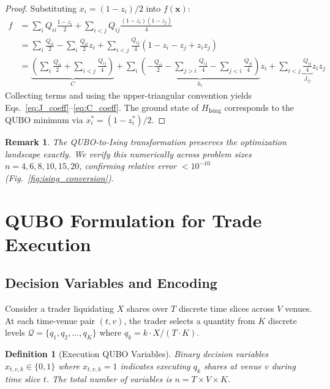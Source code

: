 \documentclass[11pt]{article}
\newcommand{\bx}{\mathbf{x}}
\newtheorem{definition}{Definition}
\newtheorem{remark}{Remark}
\begin{document}
\begin{proof}
Substituting $x_i = (1-z_i)/2$ into $f(\bx)$:
\begin{align}
f &= \sum_i Q_{ii} \frac{1-z_i}{2} + \sum_{i<j} Q_{ij} \frac{(1-z_i)(1-z_j)}{4} \\
&= \sum_i \frac{Q_{ii}}{2} - \sum_i \frac{Q_{ii}}{2}z_i + \sum_{i<j}\frac{Q_{ij}}{4}(1-z_i-z_j+z_iz_j) \\
&= \underbrace{\left(\sum_i \frac{Q_{ii}}{2} + \sum_{i<j}\frac{Q_{ij}}{4}\right)}_{C} + \sum_i \underbrace{\left(-\frac{Q_{ii}}{2} - \sum_{j>i}\frac{Q_{ij}}{4} - \sum_{j<i}\frac{Q_{ji}}{4}\right)}_{h_i} z_i + \sum_{i<j}\underbrace{\frac{Q_{ij}}{4}}_{J_{ij}} z_iz_j
\end{align}
Collecting terms and using the upper-triangular convention yields Eqs.~\eqref{eq:J_coeff}--\eqref{eq:C_coeff}. The ground state of $H_{\mathrm{Ising}}$ corresponds to the QUBO minimum via $x_i^* = (1-z_i^*)/2$.
\end{proof}

\begin{remark}
The QUBO-to-Ising transformation preserves the optimization landscape exactly. We verify this numerically across problem sizes $n = 4, 6, 8, 10, 15, 20$, confirming relative error $< 10^{-10}$ (Fig.~\ref{fig:ising_conversion}).
\end{remark}


\section{QUBO Formulation for Trade Execution}
\label{sec:qubo_formulation}

\subsection{Decision Variables and Encoding}

Consider a trader liquidating $X$ shares over $T$ discrete time slices across $V$ venues. At each time-venue pair $(t,v)$, the trader selects a quantity from $K$ discrete levels $\mathcal{Q} = \{q_1, q_2, \ldots, q_K\}$ where $q_k = k \cdot X / (T \cdot K)$.

\begin{definition}[Execution QUBO Variables]
Binary decision variables $x_{t,v,k} \in \{0,1\}$ where $x_{t,v,k} = 1$ indicates executing $q_k$ shares at venue $v$ during time slice $t$. The total number of variables is $n = T \times V \times K$.
\end{definition}
\end{document}
